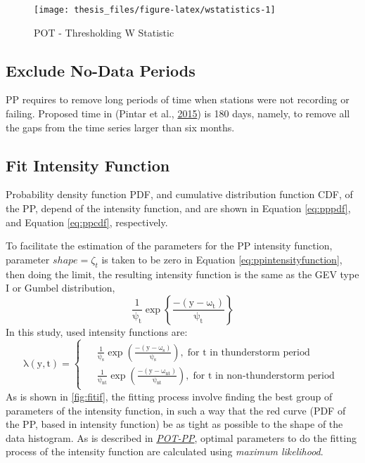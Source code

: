 \documentclass[12pt,twoside]{reedthesis}
\begin{document}
\footnotesize
\begin{figure}

{\centering \texttt{[image: thesis\_files/figure-latex/wstatistics-1]} 

}

\caption{POT - Thresholding W Statistic}\label{fig:wstatistics}
\end{figure}
\normalsize

\hypertarget{exclude-no-data-periods}{%
\subsection{Exclude No-Data Periods}\label{exclude-no-data-periods}}

PP requires to remove long periods of time when stations were not recording or failing. Proposed time in (Pintar et al., \protect\hyperlink{ref-Pintar2015}{2015}) is 180 days, namely, to remove all the gaps from the time series larger than six months.

\hypertarget{fit-intensity-function}{%
\subsection{Fit Intensity Function}\label{fit-intensity-function}}

Probability density function PDF, and cumulative distribution function CDF, of the PP, depend of the intensity function, and are shown in Equation \eqref{eq:pppdf}, and Equation \eqref{eq:ppcdf}, respectively.

To facilitate the estimation of the parameters for the PP intensity function, parameter \(shape = \zeta_t\) is taken to be zero in Equation \eqref{eq:ppintensityfunction}, then doing the limit, the resulting intensity function is the same as the GEV type I or Gumbel distribution,
\begin{equation}
  \mathrm{
          \frac{1}{\psi_t}\exp\left\{\frac{-(y-\omega_t)}{\psi_t}\right\}
         }
  \label{eq:ppusedif}
\end{equation}
In this study, used intensity functions are:
\begin{equation}
  \mathrm{
    \lambda\left(y,t\right)=
    \begin{cases}
      \begin{split}
            &\frac{1}{\psi_s}\exp\left(\frac{-(y-\omega_s)}{\psi_s}\right),\;\textrm{for t in thunderstorm period}
            \\
            &\frac{1}{\psi_{nt}}\exp\left(\frac{-(y-\omega_{nt})}{\psi_{nt}}\right),\;\textrm{for t in non-thunderstorm period}    
      \end{split}
    \end{cases}
  }
  \label{eq:ppspecificintensityfunction}
\end{equation}
As is shown in \ref{fig:fitif}, the fitting process involve finding the best group of parameters of the intensity function, in such a way that the red curve (PDF of the PP, based in intensity function) be as tight as possible to the shape of the data histogram. As is described in \emph{\protect\hyperlink{pot-pp}{POT-PP}}, optimal parameters to do the fitting process of the intensity function are calculated using \emph{maximum likelihood}.
\end{document}
